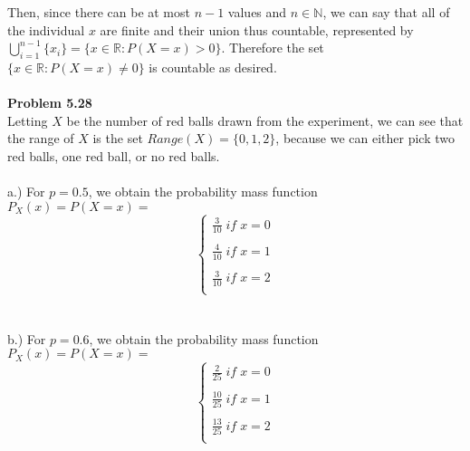 \documentclass{article}
\begin{document}
Then, since there can be at most $n-1$ values and $n\in \mathbb{N}$, we can say that all of the individual $x$ are finite and their union thus countable, represented by $\bigcup_{i=1}^{n-1}\{x_{i}\} = \{x\in \mathbb{R}: P(X=x)>0\}$. Therefore the set $\{x\in \mathbb{R}: P(X=x)\neq0\}$ is countable as desired. 
\\\\
\noindent\textbf{Problem 5.28}\\
Letting $X$ be the number of red balls drawn from the experiment, we can see that the range of $X$ is the set $Range(X) = \{0,1,2\}$, because we can either pick two red balls, one red ball, or no red balls.
\\\\
a.) For $p=0.5$, we obtain the probability mass function $P_{X}(x)=P(X=x)=$
\[   \left\{
\begin{array}{ll}
      \frac{3}{10} \;if\; x = 0 \\
      \\
      \frac{4}{10} \;if\; x = 1 \\
      \\
      \frac{3}{10} \;if\; x = 2 \\
\end{array} 
\right. \]
\\\\
b.) For $p=0.6$, we obtain the probability mass function $P_{X}(x)=P(X=x)=$
\[   \left\{
\begin{array}{ll}
      \frac{2}{25} \;if\; x = 0 \\
      \\
      \frac{10}{25} \;if\; x = 1 \\
      \\
      \frac{13}{25} \;if\; x = 2 \\
\end{array} 
\right. \]
\\
\end{document}
